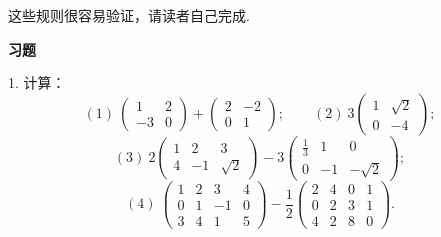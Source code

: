 \documentclass[UTF8, 12pt, fontset=fandol, oneside]{ctexart}
\begin{document}
这些规则很容易验证，请读者自己完成.

\begin{center}
\textbf{习\quad 题}
\end{center}

1. 计算：
\[
(1)\ \left(\begin{array}{cc}
1 & 2\\
-3 & 0
\end{array}\right)+
\left(\begin{array}{cc}
2 & -2\\
0 & 1
\end{array}\right);
\qquad
(2)\ 3\left(\begin{array}{cc}
1 & \sqrt{2}\\
0 & -4
\end{array}\right);
\]
\[
(3)\ 2\left(\begin{array}{ccc}
1 & 2 & 3\\
4 & -1 & \sqrt{2}
\end{array}\right)
-3\left(\begin{array}{ccc}
\frac{1}{3} & 1 & 0\\
0 & -1 & -\sqrt{2}
\end{array}\right);
\]
\[
(4)\ \left(\begin{array}{cccc}
1 & 2 & 3 & 4\\
0 & 1 & -1 & 0\\
3 & 4 & 1 & 5
\end{array}\right)
-\frac{1}{2}\left(\begin{array}{cccc}
2 & 4 & 0 & 1\\
0 & 2 & 3 & 1\\
4 & 2 & 8 & 0
\end{array}\right).
\]
\end{document}
